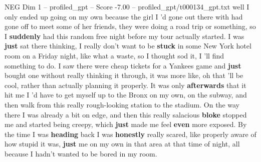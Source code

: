 \begin{textsample}{NEG Dim 1 – profiled\_gpt – Score -7.00 – profiled\_gpt/t000134\_gpt.txt}  \label{ex:f1_neg_017}
well I only ended up going on my own because the girl I ’d gone out there with had gone off to meet some of her friends, they were doing a road trip or something, so I \textbf{suddenly} had this random free night before my tour actually started.
I was \textbf{just} sat there thinking, I really don't want to be \textbf{stuck} in some New York hotel room on a Friday night, like what a waste, so I thought sod it, I ’ll find something to do.
I saw there were cheap tickets for a Yankees game and \textbf{just} bought one without really thinking it through, it was more like, oh that ’ll be cool, rather than actually planning it properly.
It was only \textbf{afterwards} that it hit me I ’d have to get myself up to the Bronx on my own, on the subway, and then walk from this really rough-looking station to the stadium.
On the way there I was already a bit on edge, and then this really salacious \textbf{bloke} stopped me and started being creepy, which \textbf{just} made me feel \textbf{even} more exposed.
By the time I was \textbf{heading} back I was \textbf{honestly} really scared, like properly aware of how stupid it was, \textbf{just} me on my own in that area at that time of night, all because I hadn't wanted to be bored in my room.

\end{textsample}
